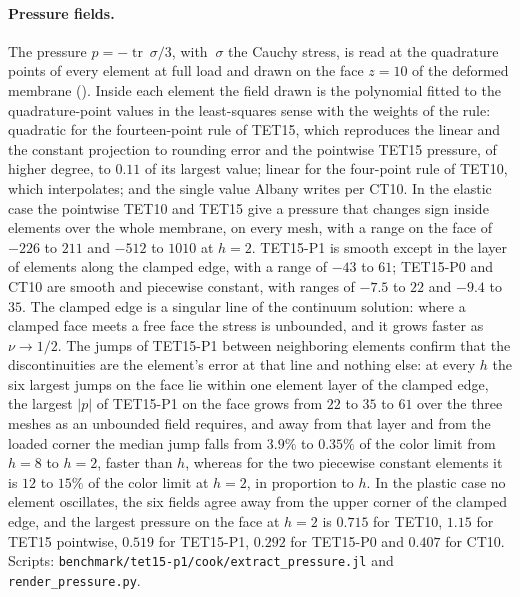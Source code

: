 \documentclass{article}
\newcommand{\trace}{\operatorname{tr}}
\newcommand{\code}[1]{\texttt{#1}}
\theoremstyle{definition}
\theoremstyle{plain}
\begin{document}
\paragraph{Pressure fields.} The pressure $p = -\trace~\sigma/3$, with
$~\sigma$ the Cauchy stress, is read at the quadrature points of every
element at full load and drawn on the face $z = 10$ of the deformed
membrane (). Inside each
element the field drawn is the polynomial fitted to the quadrature-point
values in the least-squares sense with the weights of the rule: quadratic
for the fourteen-point rule of TET15, which reproduces the linear
and the constant projection to rounding error and the pointwise
TET15 pressure, of higher degree, to $0.11$ of its largest value;
linear for the four-point rule of TET10, which interpolates; and
the single value Albany writes per CT10. In the elastic
case the pointwise TET10 and TET15 give a pressure that
changes sign inside elements over the whole membrane, on every mesh, with
a range on the face of $-226$ to $211$ and $-512$ to $1010$ at $h = 2$.
TET15-P1 is smooth except in the layer of elements along the
clamped edge, with a range of $-43$ to $61$; TET15-P0 and
CT10 are smooth and piecewise constant, with ranges of
$-7.5$ to $22$ and $-9.4$ to $35$. The clamped edge is a singular line of
the continuum solution: where a clamped face meets a free face the stress is
unbounded, and it grows faster as $\nu \to 1/2$. The jumps of TET15-P1
between neighboring elements confirm that the discontinuities
are the element's error at that line and nothing else: at every $h$ the
six largest jumps on the face lie within one element layer of the clamped
edge, the largest $\lvert p \rvert$ of TET15-P1 on the face
grows from $22$ to $35$ to $61$ over the three meshes as an unbounded field
requires, and away from that layer and from the loaded corner the median
jump falls from $3.9\%$ to $0.35\%$ of the color limit from $h = 8$ to
$h = 2$, faster than $h$, whereas for the two piecewise constant elements
it is $12$ to $15\%$ of the color limit at $h = 2$, in proportion to $h$.
In the plastic case no element oscillates, the six fields agree away from
the upper corner of the clamped edge, and the largest pressure on the face
at $h = 2$ is $0.715$ for TET10, $1.15$ for TET15
pointwise, $0.519$ for TET15-P1, $0.292$ for TET15-P0
and $0.407$ for CT10. Scripts:
\code{benchmark/tet15-p1/cook/extract\_pressure.jl} and
\code{render\_pressure.py}.
\end{document}
